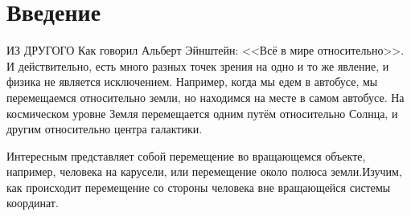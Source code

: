 \section{Введение}
    ИЗ ДРУГОГО
    Как говорил Альберт Эйнштейн: <<Всё в мире относительно>>. И действительно, есть много разных точек зрения на одно и то же явление, и физика не является исключением. Например, когда мы едем в автобусе, мы перемещаемся относительно земли, но находимся на месте в самом автобусе. На космическом уровне Земля перемещается одним путём относительно Солнца, и другим относительно центра галактики.

    Интересным представляет собой перемещение во вращающемся объекте, например, человека на карусели, или перемещение около полюса земли.Изучим, как происходит перемещение со стороны человека вне вращающейся системы координат.
